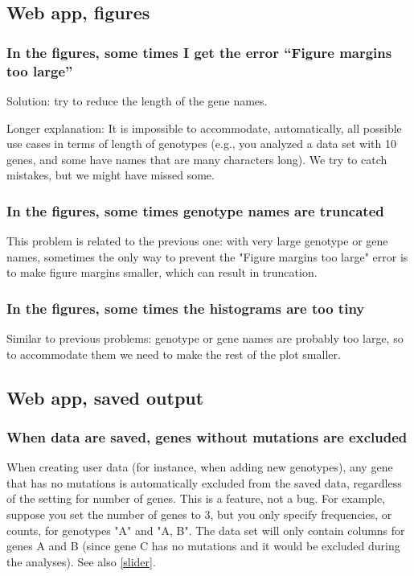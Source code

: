\documentclass[a4paper,11pt]{article}
\begin{document}
\subsection{Web app, figures}
\subsubsection{In the figures, some times I get the error ``Figure margins too large''}

Solution: try to reduce the length of the gene names. 

Longer explanation: It is impossible to accommodate, automatically, all possible use cases in terms of length of genotypes (e.g., you analyzed a data set with 10 genes, and some have names that are many characters long). We try to catch mistakes, but we might have missed some.

\subsubsection{In the figures, some times genotype names are truncated}

This problem is related to the previous one: with very large genotype or gene names, sometimes the only way to prevent the "Figure margins too large" error is to make figure margins smaller, which can result in truncation. 


\subsubsection{In the figures, some times the histograms are too tiny}

Similar to previous problems: genotype or gene names are probably too large, so to accommodate them we need to make the rest of the plot smaller.

\subsection{Web app, saved output}
\subsubsection{When data are saved, genes without mutations are excluded}
\label{sec:number-genes-genes}

 When creating user data (for instance, when adding new genotypes), any gene that has no mutations is automatically excluded from the saved data, regardless of the setting for number of genes. This is a feature, not a bug. For example, suppose you set the number of genes to 3, but you only specify frequencies, or counts, for genotypes "A" and "A, B". The data set will only contain columns for genes A and B (since gene C has no mutations and it would be excluded during the analyses). See also \ref{slider}.
\end{document}

